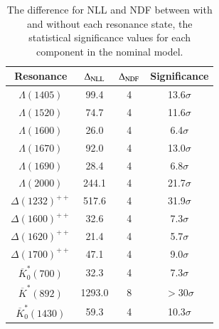 \begin{table}[h]
    \centering
    \caption{The difference for NLL and NDF between with and without each resonance state, the statistical significance values for each component in the nominal model.}
    \label{tab:nom_significance}
    \begin{tabular}{cccc}
        \hline\hline
    Resonance & $\Delta_{\rm NLL}$ & $\Delta_{\rm NDF}$ & Significance \\\hline
    $\Lambda(1405)$ & 99.4 & 4 & 13.6$\sigma$ \\
    $\Lambda(1520)$ & 74.7 & 4 & 11.6$\sigma$ \\
    $\Lambda(1600)$ & 26.0 & 4 & 6.4$\sigma$ \\
    $\Lambda(1670)$ & 92.0 & 4 & 13.0$\sigma$ \\
    $\Lambda(1690)$ & 28.4 & 4 & 6.8$\sigma$ \\
    $\Lambda(2000)$ & 244.1 & 4 & 21.7$\sigma$ \\
    $\Delta(1232)^{++}$ & 517.6 & 4 & 31.9$\sigma$ \\
    $\Delta(1600)^{++}$ & 32.6 & 4 & 7.3$\sigma$ \\
    $\Delta(1620)^{++}$ & 21.4 & 4 & 5.7$\sigma$ \\
    $\Delta(1700)^{++}$ & 47.1 & 4 & 9.0$\sigma$ \\
    $\overline{K}^{*}_{0}(700)$ & 32.3 & 4 & 7.3$\sigma$ \\
    $\overline{K}^{*}(892)$ & 1293.0 & 8 & $>30\sigma$ \\
    $\overline{K}^{*}_{0}(1430)$ & 59.3 & 4 & 10.3$\sigma$ \\
    \hline\hline
    \end{tabular}
\end{table}

